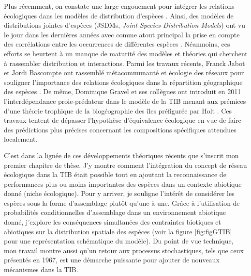 Plus récemment, on constate une large engouement pour intégrer les
relations écologiques dans les modèles de distribution d'espèces
\citep{Kissling2012, Guisan2011}. Ainsi, des modèles de distributions
jointes d'espèces (JSDMs, \emph{Joint Species Distribution Models}) ont
vu le jour dans les dernières années avec comme atout principal la prise
en compte des corrélations entre les occurrences de différentes espèces
\citep{Pollock2014, Ovaskainen2010}. Néanmoins, ces efforts se heurtent
à un manque de maturité des modèles et théories qui cherchent à
rassembler distribution et interactions. Parmi les travaux récents,
Franck Jabot et Jordi Bascompte ont rassemblé métacommunauté et écologie
des réseaux pour souligner l'importance des relations écologiques dans
la répartition géographique des espèces \citep{Jabot2012}. De même,
Dominique Gravel et ses collègues ont introduit en 2011
l'interdépendance proie-prédateur dans le modèle de la TIB menant aux
prémices d'une théorie trophique de la biogéographie des îles
\citep{Gravel2011} préfigurée par Holt \citep{Holt2009a}. Ces travaux
tentent de dépasser l'hypothèse d'équivalence écologique en vue de faire
des prédictions plus précises concernant les compositions spécifiques
attendues localement.

C'est dans la lignée de ces développements théoriques récents que
s'inscrit mon premier chapitre de thèse. J'y montre comment
l'intégration du concept de réseau écologique dans la TIB était possible
tout en ajoutant la reconnaissance de performances plus ou moins
importantes des espèces dans un contexte abiotique donné (niche
écologique). Pour y arriver, je souligne l'intérêt de considérer les
espèces sous la forme d'assemblage plutôt qu'une à une. Grâce à
l'utilisation de probabilités conditionnelles d'assemblage dans un
environnement abiotique donné, j'explore les conséquences simultanées
des contraintes biotiques et abiotiques sur la distribution spatiale des
espèces (voir la figure \ref{fig:figGTIB} pour une représentation
schématique du modèle). Du point de vue technique, mon travail montre
aussi qu'un retour aux processus stochastiques, tels que ceux présentés
en 1967, est une démarche puissante pour ajouter de nouveaux mécanismes
dans la TIB.

